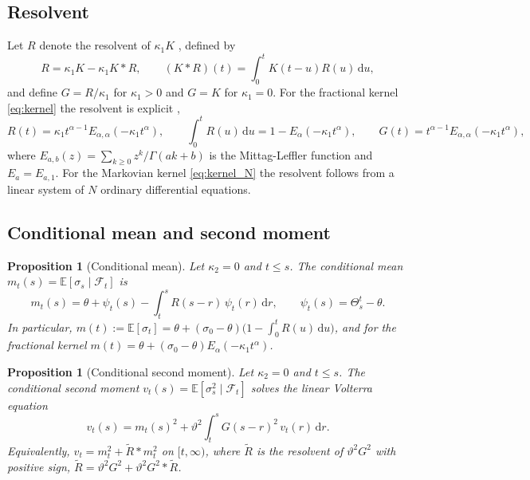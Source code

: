 \documentclass[11pt,a4paper]{article}
\newtheorem{proposition}[theorem]{Proposition}
\theoremstyle{definition}
\newcommand{\D}{\mathrm{d}}
\newcommand{\E}{\mathbb{E}}
\newcommand{\F}{\mathcal{F}}
\begin{document}
\subsection{Resolvent}

Let $R$ denote the resolvent of $\kappa_1K$ \citep[Chapter~2]{GripenbergLondenStaffans1990}, defined by
\begin{equation}\label{eq:resolvent}
R=\kappa_1K-\kappa_1K*R,\qquad (K*R)(t)=\int_0^tK(t-u)R(u)\,\D u,
\end{equation}
and define $G=R/\kappa_1$ for $\kappa_1>0$ and $G=K$ for $\kappa_1=0$. For the fractional kernel \eqref{eq:kernel} the resolvent is explicit \citep{ElEuchRosenbaum2019},
\begin{equation}\label{eq:resolvent_frac}
R(t)=\kappa_1t^{\alpha-1}E_{\alpha,\alpha}(-\kappa_1t^{\alpha}),\qquad \int_0^tR(u)\,\D u=1-E_\alpha(-\kappa_1t^\alpha),\qquad G(t)=t^{\alpha-1}E_{\alpha,\alpha}(-\kappa_1t^{\alpha}),
\end{equation}
where $E_{a,b}(z)=\sum_{k\ge0}z^k/\Gamma(ak+b)$ is the Mittag-Leffler function and $E_a=E_{a,1}$. For the Markovian kernel \eqref{eq:kernel_N} the resolvent follows from a linear system of $N$ ordinary differential equations.

\subsection{Conditional mean and second moment}

\begin{proposition}[Conditional mean]\label{prop:mean}
Let $\kappa_2=0$ and $t\le s$. The conditional mean $m_t(s)=\E[\sigma_s\mid\F_t]$ is
\begin{equation}\label{eq:cond_mean}
m_t(s)=\theta+\psi_t(s)-\int_t^sR(s-r)\,\psi_t(r)\,\D r,\qquad \psi_t(s)=\Theta^t_s-\theta .
\end{equation}
In particular, $m(t):=\E[\sigma_t]=\theta+(\sigma_0-\theta)\big(1-\int_0^tR(u)\,\D u\big)$, and for the fractional kernel $m(t)=\theta+(\sigma_0-\theta)E_\alpha(-\kappa_1t^\alpha)$.
\end{proposition}

\begin{proposition}[Conditional second moment]\label{prop:second}
Let $\kappa_2=0$ and $t\le s$. The conditional second moment $v_t(s)=\E[\sigma_s^2\mid\F_t]$ solves the linear Volterra equation
\begin{equation}\label{eq:cond_second}
v_t(s)=m_t(s)^2+\vartheta^2\int_t^sG(s-r)^2\,v_t(r)\,\D r .
\end{equation}
Equivalently, $v_t=m_t^2+\widetilde R*m_t^2$ on $[t,\infty)$, where $\widetilde R$ is the resolvent of $\vartheta^2G^2$ with positive sign, $\widetilde R=\vartheta^2G^2+\vartheta^2G^2*\widetilde R$.
\end{proposition}
\end{document}
